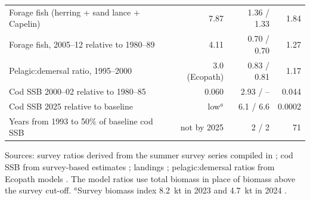 \documentclass[12pt,letterpaper,fleqn]{article}
\begin{document}
\begin{table}[p]
\begin{tabularx}{\textwidth}{@{}Lrrr@{}}
Forage fish (herring + sand lance + Capelin) & 7.87 & 1.36 / 1.33 & 1.84\\
Forage fish, 2005--12 relative to 1980--89 & 4.11 & 0.70 / 0.70 & 1.27\\
Pelagic:demersal ratio, 1995--2000 & 3.0 (Ecopath) & 0.83 / 0.81 & 1.17\\
Cod SSB 2000--02 relative to 1980--85 & 0.060 & 2.93 / -- & 0.044\\
Cod SSB 2025 relative to baseline & low$^{a}$ & 6.1 / 6.6 & 0.0002\\
Years from 1993 to 50\% of baseline cod SSB & not by 2025 & 2 / 2 & 71\\
\bottomrule
\end{tabularx}

\smallskip
\raggedright\footnotesize
Sources: survey ratios derived from the summer survey series compiled in \textcite{adekoya2026code}; cod SSB from survey-based estimates \autocite[Table~13]{fanning2003assessment}; landings \autocite{fanning2003assessment}; pelagic:demersal ratios from Ecopath models \autocite{bundy2005structure}. The model ratios use total biomass in place of biomass above the survey cut-off.
$^{a}$Survey biomass index 8.2~kt in 2023 and 4.7~kt in 2024 \autocite{dfo2025rvtrends}.
\end{table}
\end{document}
